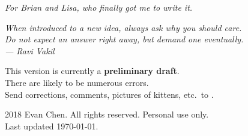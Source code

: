 \begin{titlepage}
	\vspace*{8cm}
	\begin{center}
		\itshape
		\noindent
		For Brian and Lisa, who finally got me to write it.
	\end{center}
\end{titlepage}

\begin{titlepage}
	\vspace*{8cm}
	\begin{flushright}
		\itshape\large
		When introduced to a new idea, always ask why you should care. \\[0.2cm]
		Do not expect an answer right away, but demand one eventually. \\[0.8cm]
		--- Ravi Vakil \cite{ref:vakil}
	\end{flushright}

	
	\vfill

	{
	\footnotesize
	\noindent This version is currently a \textbf{preliminary draft}. \\
	There are likely to be numerous errors. \\
	Send corrections, comments, pictures of kittens,
	etc.\ to . \\[0.8cm]
	}
	
	\vspace*{1cm}

	{
	\large
	\noindent {\copyright} 2018 Evan Chen.  All rights reserved. Personal use only. \\[0.8cm]
	Last updated \today.
	\vspace*{1cm}
	}

\end{titlepage}
